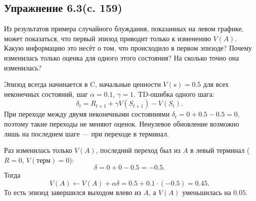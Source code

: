 \subsection{Упражнение 6.3(c. 159)}
Из результатов примера случайного блуждания, показанных на левом графике, может показаться, что первый эпизод приводит только к изменению $V(A)$. Какую информацию это несёт о том, что происходило в первом эпизоде? Почему изменилась только оценка для одного этого состояния? На сколько точно она изменилась?
\begin{solution}
    Эпизод всегда начинается в C, начальные ценности $V(s) = 0.5$ для всех неконечных состояний, шаг $\alpha = 0.1$, $\gamma = 1$. TD-ошибка одного шага:
    \[
    \delta_t = R_{t+1} + \gamma V(S_{t+1}) - V(S_t).
    \]
    При переходе между двумя неконечными состояниями $\delta_t = 0 + 0.5 - 0.5 = 0$, поэтому такие переходы не меняют оценок. Ненулевое обновление возможно лишь на последнем шаге — при переходе в терминал.

    Раз изменилась только $V(A)$, последний переход был из $A$ в левый терминал ($R = 0$, $V(\text{терм}) = 0$):
    \[
    \delta = 0 + 0 - 0.5 = -0.5.
    \]
    Тогда
    \[
    V(A) \leftarrow V(A) + \alpha \delta = 0.5 + 0.1 \cdot (-0.5) = 0.45.
    \]
    То есть эпизод завершился выходом влево из $A$, а $V(A)$ уменьшилась на $0.05$.
\end{solution}

